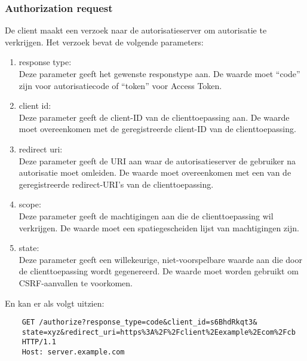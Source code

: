 \subsubsection{Authorization request}%
\label{subsubsec:authorization-request}
De client maakt een verzoek naar de autorisatieserver om autorisatie te verkrijgen. Het verzoek bevat de volgende parameters:
\begin{enumerate}[label=\textbf{-}]
    \item response type: \\
    Deze parameter geeft het gewenste responstype aan. De waarde moet ``code'' zijn voor autorisatiecode of ``token'' voor Access Token.
  
    \item client id: \\
    Deze parameter geeft de client-ID van de clienttoepassing aan. De waarde moet overeenkomen met de geregistreerde client-ID van de clienttoepassing.
  
    \item redirect uri: \\
    Deze parameter geeft de URI aan waar de autorisatieserver de gebruiker na autorisatie moet omleiden. De waarde moet overeenkomen met een van de geregistreerde redirect-URI's van de clienttoepassing.
  
    \item scope: \\
    Deze parameter geeft de machtigingen aan die de clienttoepassing wil verkrijgen. De waarde moet een spatiegescheiden lijst van machtigingen zijn.
  
    \item state: \\
    Deze parameter geeft een willekeurige, niet-voorspelbare waarde aan die door de clienttoepassing wordt gegenereerd. De waarde moet worden gebruikt om CSRF-aanvallen te voorkomen.
  \end{enumerate}
  En kan er als volgt uitzien:
  \begin{verbatim}
    GET /authorize?response_type=code&client_id=s6BhdRkqt3&
    state=xyz&redirect_uri=https%3A%2F%2Fclient%2Eexample%2Ecom%2Fcb
    HTTP/1.1
    Host: server.example.com
  \end{verbatim}

